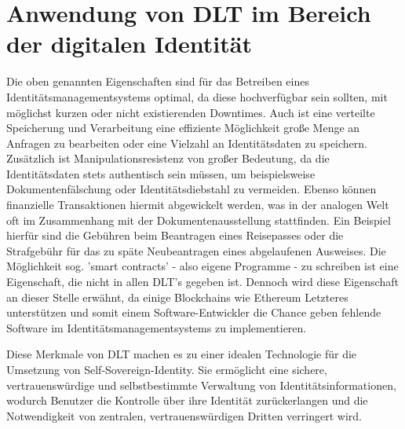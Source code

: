 \section{Anwendung von DLT im Bereich der digitalen Identität}
Die oben genannten Eigenschaften sind für das Betreiben eines Identitätsmanagementsystems optimal, da diese hochverfügbar sein sollten, mit möglichst kurzen oder nicht existierenden Downtimes. Auch ist eine verteilte Speicherung und Verarbeitung eine effiziente Möglichkeit große Menge an Anfragen zu bearbeiten oder eine Vielzahl an Identitätsdaten zu speichern. Zusätzlich ist Manipulationsresistenz von großer Bedeutung, da die Identitätsdaten stets authentisch sein müssen, um beispielsweise Dokumentenfälschung oder Identitätsdiebstahl zu vermeiden. Ebenso können finanzielle Transaktionen hiermit abgewickelt werden, was in der analogen Welt oft im Zusammenhang mit der Dokumentenausstellung stattfinden. Ein Beispiel hierfür sind die Gebühren beim Beantragen eines Reisepasses oder die Strafgebühr für das zu späte Neubeantragen eines abgelaufenen Ausweises.
Die Möglichkeit sog. 'smart contracts' - also eigene Programme - zu schreiben ist eine Eigenschaft, die nicht in allen DLT's gegeben ist. Dennoch wird diese Eigenschaft an dieser Stelle erwähnt, da einige Blockchains wie Ethereum Letzteres unterstützen und somit einem Software-Entwickler die Chance geben fehlende Software im Identitätsmanagementsystems zu implementieren.

Diese Merkmale von DLT machen es zu einer idealen Technologie für die Umsetzung von Self-Sovereign-Identity. Sie ermöglicht eine sichere, vertrauenswürdige und selbstbestimmte Verwaltung von Identitätsinformationen, wodurch Benutzer die Kontrolle über ihre Identität zurückerlangen und die Notwendigkeit von zentralen, vertrauenswürdigen Dritten verringert wird.

